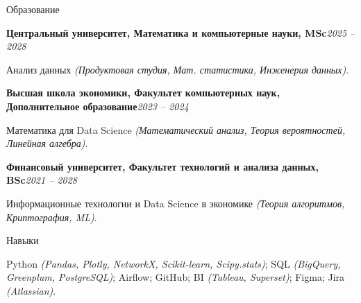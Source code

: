 \documentclass[]{mcdowellcv}
\renewenvironment{cvsubsection}[2]{%
  \begin{adjustwidth}{\subsectionmargin}{\subsectionmargin}%
    {\bfseries #1}\hfill #2\par\vspace{0.5em}%
}{%
  \end{adjustwidth}%
  \vspace*{\aftersubsectionspace}%
}
\begin{document}
    \begin{cvsection}{\Large Образование}
        \begin{cvsubsection}{Центральный университет, Математика и компьютерные науки, MSc}{\textit{2025 -- 2028}}
		\vspace{-2.9em}
			\begin{cvsubsection}{}{}{}  
        		Анализ данных \textit{(Продуктовая студия, Мат. статистика, Инженерия данных)}.
			\end{cvsubsection}
        \end{cvsubsection}
        \begin{cvsubsection}{Высшая школа экономики, Факультет компьютерных наук, Дополнительное образование}{\textit{2023 -- 2024}}
		\vspace{-2.9em}
			\begin{cvsubsection}{}{}{}  
        		Математика для Data Science \textit{(Математический анализ, Теория вероятностей, Линейная алгебра)}.
			\end{cvsubsection}
        \end{cvsubsection}
        \begin{cvsubsection}{Финансовый университет, Факультет технологий и анализа данных, BSc}{\textit{2021 -- 2028}}
		\vspace{-2.9em}
			\begin{cvsubsection}{}{}{}  
        		Информационные технологии и Data Science в экономике \textit{(Теория алгоритмов, Криптография, ML)}.
			\end{cvsubsection}	
        \end{cvsubsection}
    \end{cvsection}
    
    \begin{cvsection}{\Large Навыки}
	\vspace{-1.5em}
    \begin{cvsubsection}{}{}{}  
        Python \textit{(Pandas, Plotly, NetworkX, Scikit-learn, Scipy.stats)}; SQL \textit{(BigQuery, Greenplum, PostgreSQL)}; Airflow; GitHub; BI \textit{(Tableau, Superset)}; Figma; Jira \textit{(Atlassian)}.
    \end{cvsubsection}
	\end{cvsection}
    
\end{document}
